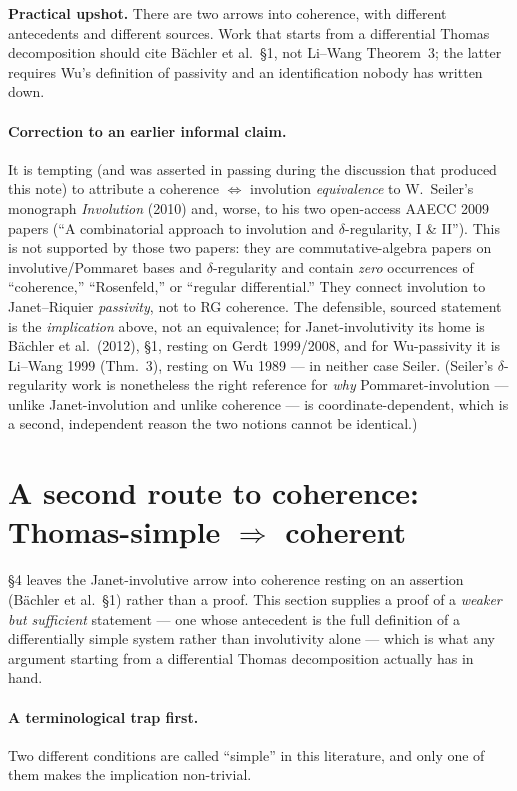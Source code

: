 \documentclass[11pt]{article}
\begin{document}
\noindent
\textbf{Practical upshot.} There are two arrows into coherence, with different
antecedents and different sources. Work that starts from a differential Thomas
decomposition should cite B\"achler et al.\ \S1, not Li--Wang Theorem~3; the
latter requires Wu's definition of passivity and an identification nobody has
written down.

\paragraph{Correction to an earlier informal claim.} It is tempting (and was
asserted in passing during the discussion that produced this note) to attribute
a coherence $\Leftrightarrow$ involution \emph{equivalence} to W.~Seiler's
monograph \emph{Involution} (2010) and, worse, to his two open-access AAECC 2009
papers (``A combinatorial approach to involution and $\delta$-regularity, I \&
II''). This is not supported by those two papers: they are commutative-algebra
papers on involutive/Pommaret bases and $\delta$-regularity and contain
\emph{zero} occurrences of ``coherence,'' ``Rosenfeld,'' or ``regular
differential.'' They connect involution to Janet--Riquier \emph{passivity}, not
to RG coherence. The defensible, sourced statement is the \emph{implication}
above, not an equivalence; for Janet-involutivity its home is B\"achler et al.\
(2012), \S1, resting on Gerdt 1999/2008, and for Wu-passivity it is Li--Wang
1999 (Thm.~3), resting on Wu 1989 --- in neither case Seiler. (Seiler's $\delta$-regularity work is nonetheless
the right reference for \emph{why} Pommaret-involution --- unlike Janet-involution
and unlike coherence --- is coordinate-dependent, which is a second, independent
reason the two notions cannot be identical.)

\section{A second route to coherence: Thomas-simple $\Rightarrow$ coherent}
\label{sec:simple-coherent}

\S4 leaves the Janet-involutive arrow into coherence resting on an assertion
(B\"achler et al.\ \S1) rather than a proof. This section supplies a proof of a
\emph{weaker but sufficient} statement --- one whose antecedent is the full
definition of a differentially simple system rather than involutivity alone ---
which is what any argument starting from a differential Thomas decomposition
actually has in hand.

\paragraph{A terminological trap first.} Two different conditions are called
``simple'' in this literature, and only one of them makes the implication
non-trivial.
\end{document}
